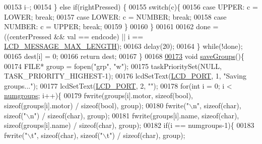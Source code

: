 \begin{DoxyCode}
00153             i--;
00154         \} \textcolor{keywordflow}{else} \textcolor{keywordflow}{if}(rightPressed) \{
00155             \textcolor{keywordflow}{switch}(c)\{
00156                 \textcolor{keywordflow}{case} UPPER: c = LOWER; \textcolor{keywordflow}{break};
00157                 \textcolor{keywordflow}{case} LOWER: c = NUMBER; \textcolor{keywordflow}{break};
00158                 \textcolor{keywordflow}{case} NUMBER: c = UPPER; \textcolor{keywordflow}{break};
00159             \}
00160         \}
00161 
00162         done = ((centerPressed && val == endcode) || i == \hyperlink{lcdmsg_8h_abe4c4b70fc6f44ae3680e5b2c68cdd00}{LCD\_MESSAGE\_MAX\_LENGTH});
00163         delay(20);
00164     \} \textcolor{keywordflow}{while}(!done);
00165     dest[i] = 0;
00166     \textcolor{keywordflow}{return} dest;
00167 \}
00168 
\hypertarget{lcddiag_8c_source.tex_l00173}{}\hyperlink{lcddiag_8c_a816c6a9d20d80fcfcc4b684df11531b5}{00173} \textcolor{keywordtype}{void} \hyperlink{lcddiag_8c_a816c6a9d20d80fcfcc4b684df11531b5}{saveGroups}()\{
00174     FILE* group = fopen(\textcolor{stringliteral}{"grp"}, \textcolor{stringliteral}{"w"});
00175     taskPrioritySet(NULL, TASK\_PRIORITY\_HIGHEST-1);
00176     lcdSetText(\hyperlink{lcdmsg_8h_abcf42bd88b3c36193f301ca25b033875}{LCD\_PORT}, 1, \textcolor{stringliteral}{"Saving groups..."});
00177     lcdSetText(\hyperlink{lcdmsg_8h_abcf42bd88b3c36193f301ca25b033875}{LCD\_PORT}, 2, \textcolor{stringliteral}{""});
00178     \textcolor{keywordflow}{for}(\textcolor{keywordtype}{int} i = 0; i < \hyperlink{lcddiag_8c_a205f1cedec1664555276e0a71a1c87d8}{numgroups}; i++)\{
00179         fwrite(groups[i].motor, \textcolor{keyword}{sizeof}(\textcolor{keywordtype}{bool}), \textcolor{keyword}{sizeof}(groups[i].motor) / \textcolor{keyword}{sizeof}(\textcolor{keywordtype}{bool}), group);
00180         fwrite(\textcolor{stringliteral}{"\(\backslash\)n"}, \textcolor{keyword}{sizeof}(\textcolor{keywordtype}{char}), \textcolor{keyword}{sizeof}(\textcolor{stringliteral}{"\(\backslash\)n"}) / \textcolor{keyword}{sizeof}(\textcolor{keywordtype}{char}), group);
00181         fwrite(groups[i].name, \textcolor{keyword}{sizeof}(\textcolor{keywordtype}{char}), \textcolor{keyword}{sizeof}(groups[i].name) / \textcolor{keyword}{sizeof}(\textcolor{keywordtype}{char}), group);
00182         \textcolor{keywordflow}{if}(i == numgroups-1)\{
00183             fwrite(\textcolor{stringliteral}{"\(\backslash\)t"}, \textcolor{keyword}{sizeof}(\textcolor{keywordtype}{char}), \textcolor{keyword}{sizeof}(\textcolor{stringliteral}{"\(\backslash\)t"}) / \textcolor{keyword}{sizeof}(\textcolor{keywordtype}{char}), group);

\end{DoxyCode}
